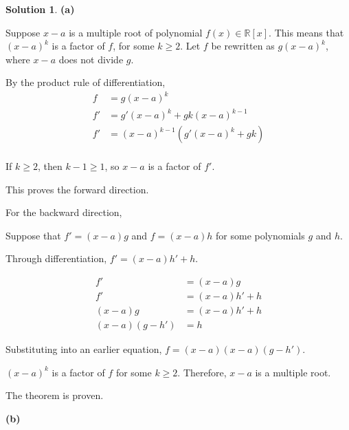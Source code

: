 \documentclass[12pt]{article}
\theoremstyle{definition}
\newtheorem*{soln}{Solution}
\newcommand{\RR}{{\mathbb{R}}}
\begin{document}
\begin{soln}

\textbf{(a)}

Suppose $x-a$ is a multiple root of polynomial $f(x)\in\RR[x]$.
This means that $(x-a)^k$ is a factor of $f$, for some $k\geq2$.
Let $f$ be rewritten as $g(x-a)^k$,
where $x-a$ does not divide $g$.

By the product rule of differentiation,
\begin{align*}
f&=g(x-a)^k\\
f'&=g'(x-a)^k + gk(x-a)^{k-1}\\
f'&=(x-a)^{k-1}(g'(x-a)^k+gk)\\
\end{align*}

If $k\geq 2$, then $k-1\geq 1$, so $x-a$ is a factor of $f'$.

This proves the forward direction.

For the backward direction,

Suppose that $f'=(x-a)g$ and $f=(x-a)h$ for some polynomials $g$ and $h$.

Through differentiation, $f'=(x-a)h'+h$.

\begin{align*}
f'&=(x-a)g\\
f'&=(x-a)h'+h\\
(x-a)g&=(x-a)h'+h\\
(x-a)(g-h')&=h
\end{align*}


Substituting into an earlier equation,
$f=(x-a)(x-a)(g-h')$.

$(x-a)^k$ is a factor of $f$ for some $k\geq 2$.
Therefore, $x-a$ is a multiple root.

The theorem is proven.

\textbf{(b)}



\end{soln}
\end{document}
